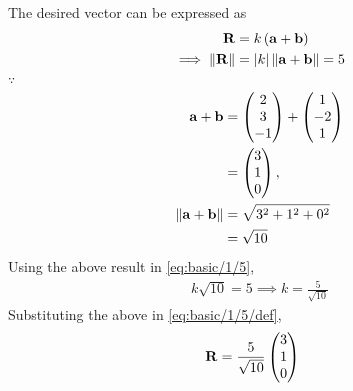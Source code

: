 The desired vector can be expressed as 
%
\begin{align}
\label{eq:basic/1/5/def}
  \mathbf{R} &=k\left(\mathbf{a}+\mathbf{b}\right)\\
  \implies\left\lVert\mathbf{R}\right\rVert &=\left\vert k\right\vert\left\lVert\mathbf{a}+\mathbf{b}\right\rVert = 5
  \label{eq:basic/1/5}
\end{align}
$\because$ 
\begin{align}
	\mathbf{a}+\mathbf{b} &= 
  \begin{pmatrix}2\\ 3\\ -1\end{pmatrix}+\begin{pmatrix}1\\ -2\\ 1\end{pmatrix} \\
  &= \begin{pmatrix}3\\ 1\\ 0\end{pmatrix},
  \\
	\left\lVert\mathbf{a}+\mathbf{b}\right\rVert &= \sqrt{3^2+1^2+0^2}
	\\
			       &= \sqrt{10}
\end{align}
Using the above result in \eqref{eq:basic/1/5}, 
%
\begin{align}
k \sqrt{10}= 5 \implies k = \frac{5}{ \sqrt{10}}
\end{align}
Substituting the above in 
\eqref{eq:basic/1/5/def}, 
\begin{align}
  \mathbf{R} &= 
  \frac{5}{\sqrt{10}}\begin{pmatrix}3\\ 1\\ 0\end{pmatrix}
\end{align}
